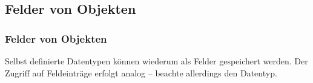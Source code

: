 \def\sstitle{Felder von Objekten}
\subsection{\sstitle}
\begin{frame}%
  \frametitle{\sstitle}%
Selbst definierte Datentypen k\"onnen wiederum als Felder gespeichert werden.
Der Zugriff auf Feldeintr\"age erfolgt analog -- beachte allerdings den Datentyp.

\end{frame}
